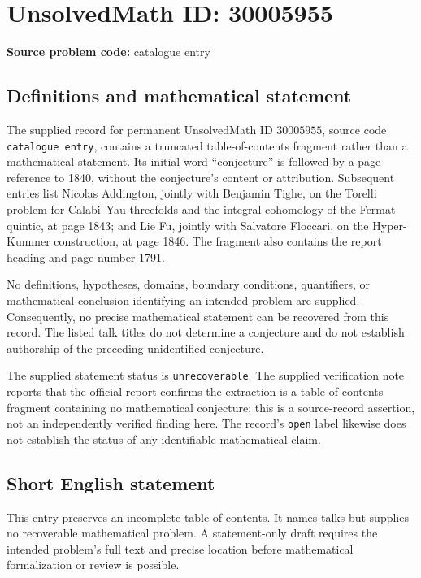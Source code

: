 \documentclass[11pt]{article}
\begin{document}
\section*{UnsolvedMath ID: 30005955}
\textbf{Source problem code:} catalogue entry
\subsection{Definitions and mathematical statement}
The supplied record for permanent UnsolvedMath ID \(30005955\), source code \texttt{catalogue entry}, contains a truncated table-of-contents fragment rather than a mathematical statement. Its initial word ``conjecture'' is followed by a page reference to 1840, without the conjecture's content or attribution. Subsequent entries list Nicolas Addington, jointly with Benjamin Tighe, on the Torelli problem for Calabi--Yau threefolds and the integral cohomology of the Fermat quintic, at page 1843; and Lie Fu, jointly with Salvatore Floccari, on the Hyper-Kummer construction, at page 1846. The fragment also contains the report heading and page number 1791.

No definitions, hypotheses, domains, boundary conditions, quantifiers, or mathematical conclusion identifying an intended problem are supplied. Consequently, no precise mathematical statement can be recovered from this record. The listed talk titles do not determine a conjecture and do not establish authorship of the preceding unidentified conjecture.

The supplied statement status is \texttt{unrecoverable}. The supplied verification note reports that the official report confirms the extraction is a table-of-contents fragment containing no mathematical conjecture; this is a source-record assertion, not an independently verified finding here. The record's \texttt{open} label likewise does not establish the status of any identifiable mathematical claim.
\subsection{Short English statement}
This entry preserves an incomplete table of contents. It names talks but supplies no recoverable mathematical problem. A statement-only draft requires the intended problem's full text and precise location before mathematical formalization or review is possible.
\end{document}
